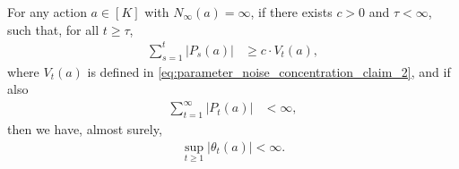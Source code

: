 \begin{lemma}
\label{lem:bounded_progress_bounded_parameter}
For any action $a \in [K]$ with $N_\infty(a) = \infty$, if there exists $c > 0$ and $\tau < \infty$, such that, for all $t \ge \tau$,
\begin{align}
\label{eq:bounded_progress_bounded_parameter_claim_1}
    \sum_{s=1}^{t} \big| P_s(a) \big| &\ge c \cdot V_t(a),
\end{align}
where $V_t(a)$ is defined in \cref{eq:parameter_noise_concentration_claim_2}, and if also
\begin{align}
\label{eq:bounded_progress_bounded_parameter_claim_2}
    \sum_{t=1}^{\infty}{ \big| P_t(a) \big| } &< \infty,
\end{align}
then we have, almost surely,
\begin{align}
\label{eq:bounded_progress_bounded_parameter_claim_3}
    \sup_{t \ge 1}{ |\theta_t(a)| } < \infty.
\end{align}
\end{lemma}

